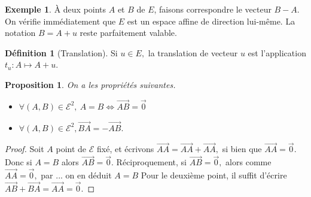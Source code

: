 \documentclass[french]{book}
\theoremstyle{plain}
\newtheorem{prop}{Proposition}[chapter]
\theoremstyle{definition}
\newtheorem{dfn}{Définition}[chapter]
\newtheorem{exa}{Exemple}[chapter]
\theoremstyle{remark}
\begin{document}
\begin{exa}
	À deux points $A$ et $B$ de $E$, faisons correspondre le vecteur $B - A.$ On vérifie immédiatement que $E$ est un espace affine de direction lui-même. La notation $B = A + u$ reste parfaitement valable.
\end{exa}

\begin{dfn}[Translation]
	Si $u \in E,$ la translation de vecteur $u$ est l'application $t_u : A \mapsto A + u.$
\end{dfn}

\begin{prop}
	On a les propriétés suivantes.
\begin{itemize}
	\item $\forall(A,B) \in \mathcal{E}^2,\ A = B \Leftrightarrow \overrightarrow{AB} = \overrightarrow{0}$
	\item $\forall(A,B) \in \mathcal{E}^2, \overrightarrow{BA} = -\overrightarrow{AB}.$
\end{itemize}
\end{prop}

\begin{proof}
	Soit $A$ point de $\mathcal{E}$ fixé, et écrivons $\overrightarrow{AA} = \overrightarrow{AA} + \overrightarrow{AA},$ si bien que $\overrightarrow{AA} = \overrightarrow{0}.$ Donc si $A = B$ alors $\overrightarrow{AB} = \overrightarrow{0}.$ Réciproquement, si $\overrightarrow{AB} = \overrightarrow{0},$ alors comme $\overrightarrow{AA} = \overrightarrow{0},$ par ... on en déduit $A = B$
Pour le deuxième point, il suffit d'écrire $\overrightarrow{AB} + \overrightarrow{BA} = \overrightarrow{AA} = \overrightarrow{0}.$
\end{proof}
\end{document}
